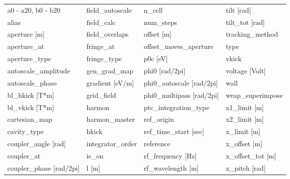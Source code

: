  \begin{tabular}{llll} \toprule
a0 - a20, b0 - b20               & field_autoscale                  & n_cell                           & tilt [rad]                       \\
alias                            & field_calc                       & num_steps                        & tilt_tot [rad]                   \\
aperture [m]                     & field_overlaps                   & offset [m]                       & tracking_method                  \\
aperture_at                      & fringe_at                        & offset_moves_aperture            & type                             \\
aperture_type                    & fringe_type                      & p0c [eV]                         & vkick                            \\
autoscale_amplitude              & gen_grad_map                     & phi0 [rad/2pi]                   & voltage [Volt]                   \\
autoscale_phase                  & gradient [eV/m]                  & phi0_autoscale [rad/2pi]         & wall                             \\
bl_hkick [T*m]                   & grid_field                       & phi0_multipass [rad/2pi]         & wrap_superimpose                 \\
bl_vkick [T*m]                   & harmon                           & ptc_integration_type             & x1_limit [m]                     \\
cartesian_map                    & harmon_master                    & ref_origin                       & x2_limit [m]                     \\
cavity_type                      & hkick                            & ref_time_start [sec]             & x_limit [m]                      \\
coupler_angle [rad]              & integrator_order                 & reference                        & x_offset [m]                     \\
coupler_at                       & is_on                            & rf_frequency [Hz]                & x_offset_tot [m]                 \\
coupler_phase [rad/2pi]          & l [m]                            & rf_wavelength [m]                & x_pitch [rad]                    \\

\end{tabular}
